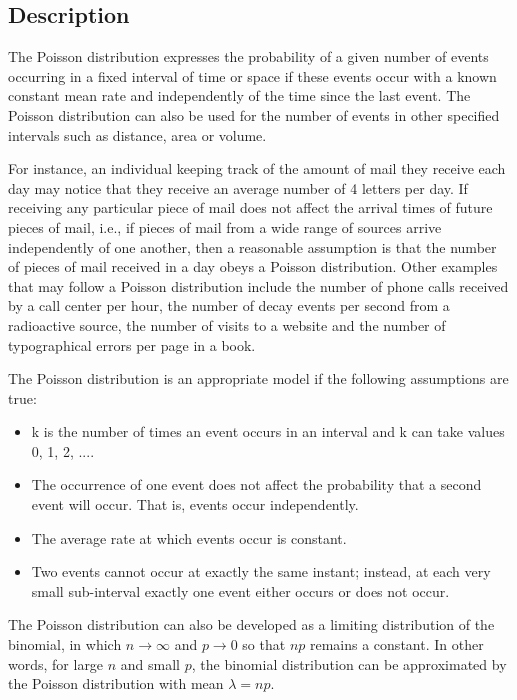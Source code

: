 \subsection{Description}
The Poisson distribution expresses the probability of a given number of events occurring in a fixed interval of time or space if these events occur with a known constant mean rate and independently of the time since the last event. The Poisson distribution can also be used for the number of events in other specified intervals such as distance, area or volume.

For instance, an individual keeping track of the amount of mail they receive each day may notice that they receive an average number of 4 letters per day. If receiving any particular piece of mail does not affect the arrival times of future pieces of mail, i.e., if pieces of mail from a wide range of sources arrive independently of one another, then a reasonable assumption is that the number of pieces of mail received in a day obeys a Poisson distribution. Other examples that may follow a Poisson distribution include the number of phone calls received by a call center per hour, the number of decay events per second from a radioactive source, the number of visits to a website and the number of typographical errors per page in a book.

The Poisson distribution is an appropriate model if the following assumptions are true:

\begin{itemize}
	\item k is the number of times an event occurs in an interval and k can take values 0, 1, 2, ....
	\item The occurrence of one event does not affect the probability that a second event will occur. That is, events occur independently.
	\item The average rate at which events occur is constant.
	\item Two events cannot occur at exactly the same instant; instead, at each very small sub-interval exactly one event either occurs or does not occur.
\end{itemize}

The Poisson distribution can also be developed as a limiting distribution of the binomial, in which $n \rightarrow \infty$ and $p \rightarrow 0$ so that $np$ remains a constant. In other words, for large $n$ and small $p$, the binomial distribution can be approximated by the Poisson distribution with mean $\lambda = np$.

